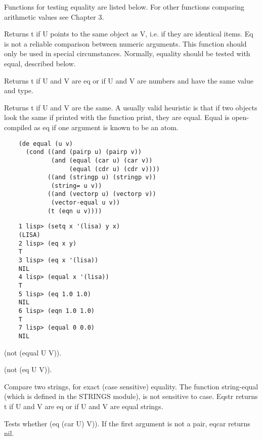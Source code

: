 \label{sec:testing-equality}
  Functions  for  testing  equality are listed below.  For other
functions comparing arithmetic values see Chapter 3.


{    Returns t if U points to  the same object as V, i.e. if they
    are identical items.    Eq  is  not  a  reliable  comparison
    between  numeric  arguments.    This function should only be
    used in special circumstances.  Normally, equality should be
    tested with equal, described below.
}

{    Returns t if U and V  are eq or if U  and V are numbers  and
    have the same value and type.
}

{    Returns  t  if  U  and  V  are  the  same.   A usually valid
    heuristic is that if two objects look the  same  if  printed
    with   the  function  print,  they  are  equal.    Equal  is
    open-compiled as eq if one argument is known to be an atom.
}
\begin{verbatim}
    (de equal (u v)
      (cond ((and (pairp u) (pairp v))
             (and (equal (car u) (car v))
                  (equal (cdr u) (cdr v))))
            ((and (stringp u) (stringp v))
             (string= u v))
            ((and (vectorp u) (vectorp v))
             (vector-equal u v))
            (t (eqn u v))))
\end{verbatim}
\begin{verbatim}
    1 lisp> (setq x '(lisa) y x)
    (LISA)
    2 lisp> (eq x y)
    T
    3 lisp> (eq x '(lisa))
    NIL
    4 lisp> (equal x '(lisa))
    T
    5 lisp> (eq 1.0 1.0)
    NIL
    6 lisp> (eqn 1.0 1.0)
    T
    7 lisp> (equal 0 0.0)
    NIL
\end{verbatim}
{    (not (equal U V)).  }

{    (not (eq U V)).  }

{    Compare two strings, for exact  (case  sensitive)  equality.
    The  function  string-equal (which is defined in the STRINGS
    module), is not sensitive to case.  Eqstr returns t if U and
    V are eq or if U and V are equal strings.  }

{    Tests whether (eq (car U) V)).  If the first argument is not
    a pair, eqcar returns nil.  }

